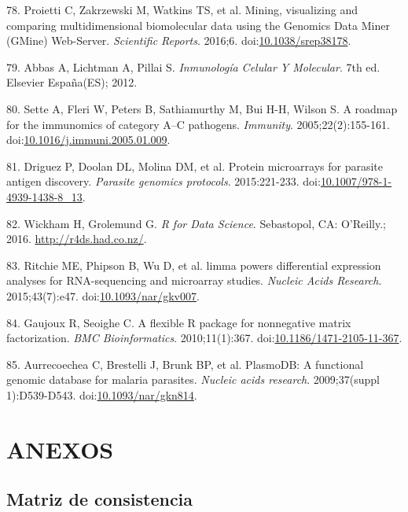 \documentclass[]{article}
\begin{document}
\hypertarget{ref-gmine2016}{}
78. Proietti C, Zakrzewski M, Watkins TS, et al. Mining, visualizing and
comparing multidimensional biomolecular data using the Genomics Data
Miner (GMine) Web-Server. \emph{Scientific Reports}. 2016;6.
doi:\href{https://doi.org/10.1038/srep38178}{10.1038/srep38178}.

\hypertarget{ref-abbas2012}{}
79. Abbas A, Lichtman A, Pillai S. \emph{Inmunología Celular Y
Molecular}. 7th ed. Elsevier España(ES); 2012.

\hypertarget{ref-sette2005}{}
80. Sette A, Fleri W, Peters B, Sathiamurthy M, Bui H-H, Wilson S. A
roadmap for the immunomics of category A--C pathogens. \emph{Immunity}.
2005;22(2):155-161.
doi:\href{https://doi.org/10.1016/j.immuni.2005.01.009}{10.1016/j.immuni.2005.01.009}.

\hypertarget{ref-Driguez2015}{}
81. Driguez P, Doolan DL, Molina DM, et al. Protein microarrays for
parasite antigen discovery. \emph{Parasite genomics protocols}.
2015:221-233.
doi:\href{https://doi.org/10.1007/978-1-4939-1438-8_13}{10.1007/978-1-4939-1438-8\_13}.

\hypertarget{ref-wickham2016r4ds}{}
82. Wickham H, Grolemund G. \emph{R for Data Science}. Sebastopol, CA:
O'Reilly.; 2016. \url{http://r4ds.had.co.nz/}.

\hypertarget{ref-limma}{}
83. Ritchie ME, Phipson B, Wu D, et al. limma powers differential
expression analyses for RNA-sequencing and microarray studies.
\emph{Nucleic Acids Research}. 2015;43(7):e47.
doi:\href{https://doi.org/10.1093/nar/gkv007}{10.1093/nar/gkv007}.

\hypertarget{ref-Gaujoux2010NMF}{}
84. Gaujoux R, Seoighe C. A flexible R package for nonnegative matrix
factorization. \emph{BMC Bioinformatics}. 2010;11(1):367.
doi:\href{https://doi.org/10.1186/1471-2105-11-367}{10.1186/1471-2105-11-367}.

\hypertarget{ref-plasmodb}{}
85. Aurrecoechea C, Brestelli J, Brunk BP, et al. PlasmoDB: A functional
genomic database for malaria parasites. \emph{Nucleic acids research}.
2009;37(suppl 1):D539-D543.
doi:\href{https://doi.org/10.1093/nar/gkn814}{10.1093/nar/gkn814}.

\section{ANEXOS}\label{anexos}

\subsection{Matriz de consistencia}\label{matriz-de-consistencia}
\end{document}
